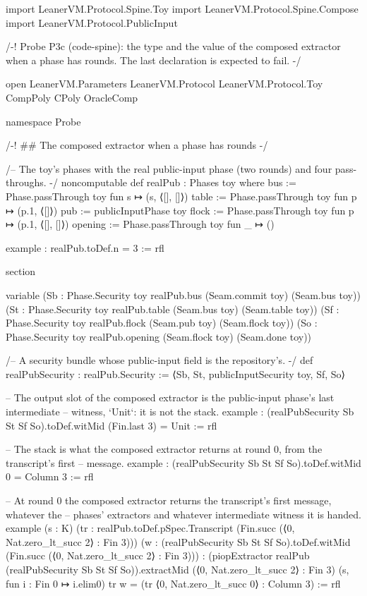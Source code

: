 \begin{leancode}
import LeanerVM.Protocol.Spine.Toy
import LeanerVM.Protocol.Spine.Compose
import LeanerVM.Protocol.PublicInput

/-!
Probe P3c (code-spine): the type and the value of the composed extractor when a phase has
rounds. The last declaration is expected to fail.
-/

open LeanerVM.Parameters LeanerVM.Protocol LeanerVM.Protocol.Toy CompPoly CPoly OracleComp

namespace Probe

/-! ## The composed extractor when a phase has rounds -/

/-- The toy's phases with the real public-input phase (two rounds) and four pass-throughs. -/
noncomputable def realPub : Phases toy where
  bus := Phase.passThrough toy fun s ↦ (s, ⟨[], []⟩)
  table := Phase.passThrough toy fun p ↦ (p.1, ⟨[]⟩)
  pub := publicInputPhase toy
  flock := Phase.passThrough toy fun p ↦ (p.1, ⟨[], []⟩)
  opening := Phase.passThrough toy fun _ ↦ ()

example : realPub.toDef.n = 3 := rfl

section

variable (Sb : Phase.Security toy realPub.bus (Seam.commit toy) (Seam.bus toy))
  (St : Phase.Security toy realPub.table (Seam.bus toy) (Seam.table toy))
  (Sf : Phase.Security toy realPub.flock (Seam.pub toy) (Seam.flock toy))
  (So : Phase.Security toy realPub.opening (Seam.flock toy) (Seam.done toy))

/-- A security bundle whose public-input field is the repository's. -/
def realPubSecurity : realPub.Security := ⟨Sb, St, publicInputSecurity toy, Sf, So⟩

-- The output slot of the composed extractor is the public-input phase's last intermediate
-- witness, `Unit`: it is not the stack.
example : (realPubSecurity Sb St Sf So).toDef.witMid (Fin.last 3) = Unit := rfl

-- The stack is what the composed extractor returns at round 0, from the transcript's first
-- message.
example : (realPubSecurity Sb St Sf So).toDef.witMid 0 = Column 3 := rfl

-- At round 0 the composed extractor returns the transcript's first message, whatever the
-- phases' extractors and whatever intermediate witness it is handed.
example (s : K)
    (tr : realPub.toDef.pSpec.Transcript (Fin.succ (⟨0, Nat.zero_lt_succ 2⟩ : Fin 3)))
    (w : (realPubSecurity Sb St Sf So).toDef.witMid (Fin.succ (⟨0, Nat.zero_lt_succ 2⟩ : Fin 3))) :
    (piopExtractor realPub (realPubSecurity Sb St Sf So)).extractMid
      (⟨0, Nat.zero_lt_succ 2⟩ : Fin 3) (s, fun i : Fin 0 ↦ i.elim0) tr w =
        (tr ⟨0, Nat.zero_lt_succ 0⟩ : Column 3) := rfl


\end{leancode}
